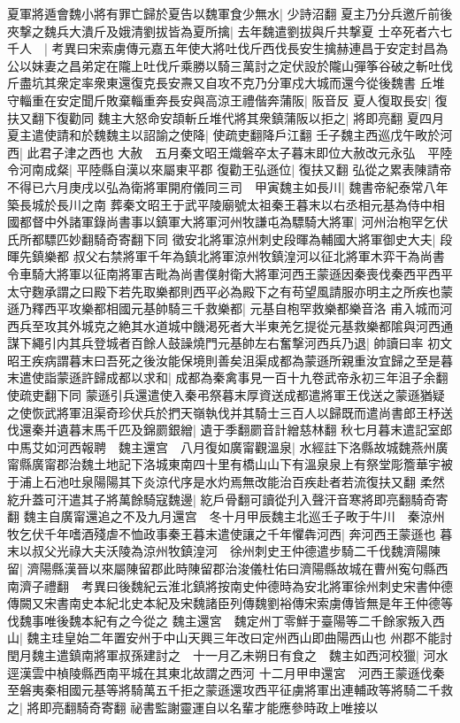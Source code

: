 夏軍將遁會魏小將有罪亡歸於夏告以魏軍食少無水|{
	少詩沼翻}
夏主乃分兵邀斤前後夾撃之魏兵大潰斤及娥清劉拔皆為夏所擒|{
	去年魏遣劉拔與斤共撃夏}
士卒死者六七千人　|{
	考異曰宋索虜傳元嘉五年使大將吐伐斤西伐長安生擒赫連昌于安定封昌為公以妹妻之昌弟定在隴上吐伐斤乘勝以騎三萬討之定伏設於隴山彈筝谷破之斬吐伐斤盡坑其衆定率衆東還復克長安燾又自攻不克乃分軍戍大城而還今從後魏書}
丘堆守輜重在安定聞斤敗棄輜重奔長安與高涼王禮偕奔蒲阪|{
	阪音反}
夏人復取長安|{
	復扶又翻下復勸同}
魏主大怒命安頡斬丘堆代將其衆鎮蒲阪以拒之|{
	將即亮翻}
夏四月夏主遣使請和於魏魏主以詔諭之使降|{
	使疏吏翻降戶江翻}
壬子魏主西巡戊午畋於河西|{
	此君子津之西也}
大赦　五月秦文昭王熾磐卒太子暮末即位大赦改元永弘　平陸令河南成粲|{
	平陸縣自漢以來屬東平郡}
復勸王弘遜位|{
	復扶又翻}
弘從之累表陳請帝不得已六月庚戌以弘為衛將軍開府儀同三司　甲寅魏主如長川|{
	魏書帝紀泰常八年築長城於長川之南}
葬秦文昭王于武平陵廟號太祖秦王暮末以右丞相元基為侍中相國都督中外諸軍錄尚書事以鎮軍大將軍河州牧謙屯為驃騎大將軍|{
	河州治枹罕乞伏氏所都驃匹妙翻騎奇寄翻下同}
徵安北將軍涼州刺史段暉為輔國大將軍御史大夫|{
	段暉先鎮樂都}
叔父右禁將軍千年為鎮北將軍涼州牧鎮湟河以征北將軍木弈干為尚書令車騎大將軍以征南將軍吉毗為尚書僕射衛大將軍河西王蒙遜因秦喪伐秦西平西平太守麴承謂之曰殿下若先取樂都則西平必為殿下之有苟望風請服亦明主之所疾也蒙遜乃釋西平攻樂都相國元基帥騎三千救樂都|{
	元基自枹罕救樂都樂音洛}
甫入城而河西兵至攻其外城克之絶其水道城中饑渇死者大半東羌乞提從元基救樂都隂與河西通謀下繩引内其兵登城者百餘人鼓譟燒門元基帥左右奮撃河西兵乃退|{
	帥讀曰率}
初文昭王疾病謂暮末曰吾死之後汝能保境則善矣沮渠成都為蒙遜所親重汝宜歸之至是暮末遣使詣蒙遜許歸成都以求和|{
	成都為秦禽事見一百十九卷武帝永初三年沮子余翻使疏吏翻下同}
蒙遜引兵還遣使入秦弔祭暮末厚資送成都遣將軍王伐送之蒙遜猶疑之使恢武將軍沮渠奇珍伏兵於捫天嶺執伐并其騎士三百人以歸既而遣尚書郎王杼送伐還秦并遺暮末馬千匹及錦罽銀繒|{
	遺于季翻罽音計繒慈林翻}
秋七月暮末遣記室郎中馬艾如河西報聘　魏主還宫　八月復如廣甯觀溫泉|{
	水經註下洛縣故城魏燕州廣甯縣廣甯郡治魏土地記下洛城東南四十里有橋山山下有溫泉泉上有祭堂彫簷華宇被于浦上石池吐泉陽陽其下炎涼代序是水灼焉無改能治百疾赴者若流復扶又翻}
柔然紇升蓋可汗遣其子將萬餘騎寇魏邊|{
	紇戶骨翻可讀從刋入聲汗音寒將即亮翻騎奇寄翻}
魏主自廣甯還追之不及九月還宫　冬十月甲辰魏主北巡壬子畋于牛川　秦涼州牧乞伏千年嗜酒殘虐不恤政事秦王暮末遣使讓之千年懼犇河西|{
	奔河西王蒙遜也}
暮末以叔父光祿大夫沃陵為涼州牧鎮湟河　徐州刺史王仲德遣步騎二千伐魏濟陽陳留|{
	濟陽縣漢晉以來屬陳留郡此時陳留郡治浚儀杜佑曰濟陽縣故城在曹州寃句縣西南濟子禮翻　考異曰後魏紀云淮北鎮將按南史仲德時為安北將軍徐州刺史宋書仲德傳闕又宋書南史本紀北史本紀及宋魏諸臣列傳魏劉裕傳宋索虜傳皆無是年王仲德等伐魏事唯後魏本紀有之今從之}
魏主還宮　魏定州丁零鮮于臺陽等二千餘家叛入西山|{
	魏主珪皇始二年置安州于中山天興三年改曰定州西山即曲陽西山也}
州郡不能討閏月魏主遣鎮南將軍叔孫建討之　十一月乙未朔日有食之　魏主如西河校獵|{
	河水逕漢雲中楨陵縣西南平城在其東北故謂之西河}
十二月甲申還宮　河西王蒙遜伐秦至磐夷秦相國元基等將騎萬五千拒之蒙遜還攻西平征虜將軍出連輔政等將騎二千救之|{
	將即亮翻騎奇寄翻}
祕書監謝靈運自以名輩才能應參時政上唯接以

